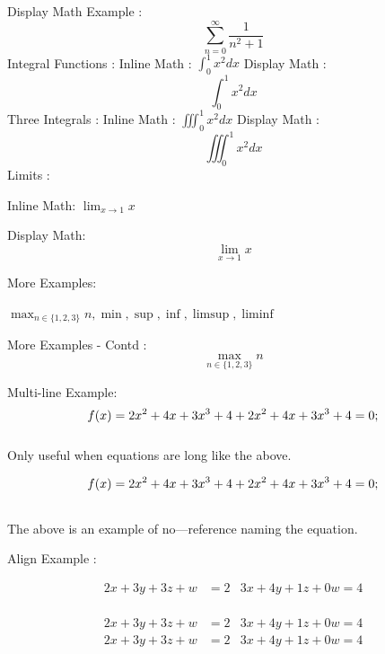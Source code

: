 \documentclass{report}
\theoremstyle{plain} %
\begin{document}
 Display Math Example : 
\[\sum_{n=0} ^ {\infty}\frac{1}{n^2+1}\]
\vspace{4mm}
Integral Functions :
Inline Math : $\int_{0}^1x^2dx$
\vspace{4mm}
\newline Display Math : \[\int_{0}^1x^2dx\]
\vspace{4mm}
\newline Three Integrals : 
Inline Math : $\iiint_{0}^1x^2dx$
\vspace{4mm}
\newline Display Math : \[\iiint_{0}^1x^2dx\]
\vspace{4mm}
\newline Limits : 
\vspace{4mm}

Inline Math: $\lim_{x\to 1}x$
\vspace{4mm}

Display Math: \[\lim_{x\to 1}x\]

More Examples: 

$\max_{n\in \{1,2,3\}}n, \min , \sup ,\inf, \limsup , \liminf $

\newpage
More Examples - Contd : 
\[\max_{n\in\{1,2,3\}}n\]

Multi-line Example:
\begin{multline}
    f(x) = 2x^2 + 4x +3x^3 + 4 + 2x^2 + 4x +3x^3 + 4= 0;
     \vspace{4mm}
\end{multline}
\newline Only useful when equations are long like the above.

\begin{multline*}
    f(x) = 2x^2 + 4x +3x^3 + 4 + 2x^2 + 4x +3x^3 + 4= 0;
     \vspace{4mm}
\end{multline*}

The above is an example of no—reference naming the equation.
\vspace{4mm}

Align Example : 

\begin{align}
     2x+3y+3z+w &= 2 & 3x+4y+1z+0w = 4 \\
\end{align}

\begin{align}
     2x+3y+3z+w &= 2 & 3x+4y+1z+0w = 4 \\
     2x+3y+3z+w &= 2 & 3x+4y+1z+0w = 4
\end{align}
\end{document}
